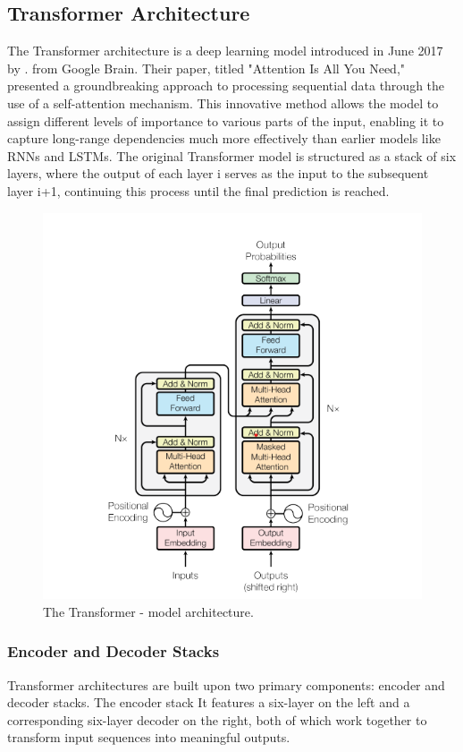 \subsection{Transformer Architecture}
The Transformer architecture is a deep learning model introduced in June 2017 by \citep{vaswani2017attention}. from Google Brain. Their paper, titled "Attention Is All You Need," presented a groundbreaking approach to processing sequential data through the use of a self-attention mechanism. This innovative method allows the model to assign different levels of importance to various parts of the input, enabling it to capture long-range dependencies much more effectively than earlier models like RNNs and LSTMs. The original Transformer model is structured as a stack of six layers, where the output of each layer i serves as the input to the subsequent layer i+1, continuing this process until the final prediction is reached.
\begin{figure}[htbp]
	
	\centerline{\includegraphics[width=.6\linewidth]{
			Figures/trasformers.png}}
	\caption{The Transformer - model architecture.}
	\label{trasformers.png}
	
\end{figure}
\subsubsection{Encoder and Decoder Stacks}
Transformer architectures are built upon two primary components: encoder and decoder stacks\citep{vaswani2017attention}. The encoder stack It features a six-layer on the left and a corresponding six-layer decoder on the right,  both of which work together to transform input sequences into meaningful outputs.


